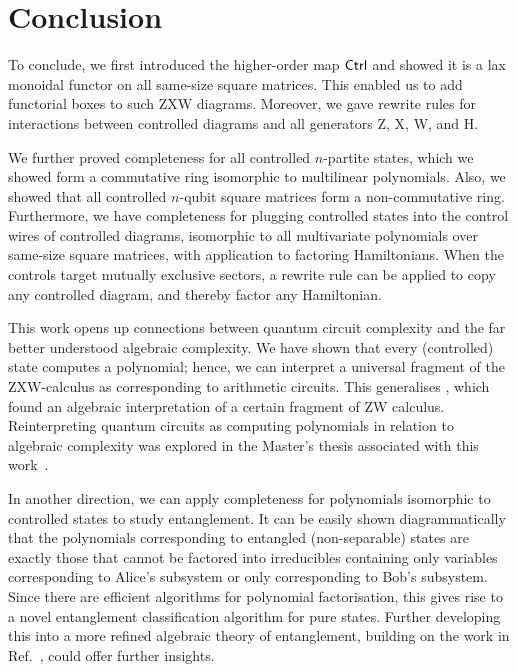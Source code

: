 \section{Conclusion}
To conclude, we first introduced the higher-order map $\textsf{Ctrl}$ and showed it is a lax monoidal functor on all same-size square matrices. This enabled us to add functorial boxes to such ZXW diagrams. Moreover, we gave rewrite rules for interactions between controlled diagrams and all generators Z, X, W, and H.

We further proved completeness for all controlled $n$-partite states, which we showed form a commutative ring isomorphic to multilinear polynomials. Also, we showed that all controlled $n$-qubit square matrices form a non-commutative ring. Furthermore, we have completeness for plugging controlled states into the control wires of controlled diagrams, isomorphic to all multivariate polynomials over same-size square matrices, with application to factoring Hamiltonians. When the controls target mutually exclusive sectors, a rewrite rule can be applied to copy any controlled diagram, and thereby factor any Hamiltonian.

This work opens up connections between quantum circuit complexity and the far better understood algebraic complexity.
We have shown that every (controlled) state computes a polynomial; hence, we can interpret a universal fragment of the ZXW-calculus as corresponding to arithmetic circuits. This generalises \cite{carette2023compositionality}, which found an algebraic interpretation of a certain fragment of ZW calculus. Reinterpreting quantum circuits as computing polynomials in relation to algebraic complexity was explored in the Master's thesis associated with this work~\cite{Agnew2023Masters}.

In another direction, we can apply completeness for polynomials isomorphic to controlled states to study entanglement. It can be easily shown diagrammatically that the polynomials corresponding to entangled (non-separable) states are exactly those that cannot be factored into irreducibles containing only variables corresponding to Alice's subsystem or only corresponding to Bob's subsystem. Since there are efficient algorithms for polynomial factorisation, this gives rise to a novel entanglement classification algorithm for pure states. Further developing this into a more refined algebraic theory of entanglement, building on the work in Ref.~\cite{Agnew2023Masters}, could offer further insights.

